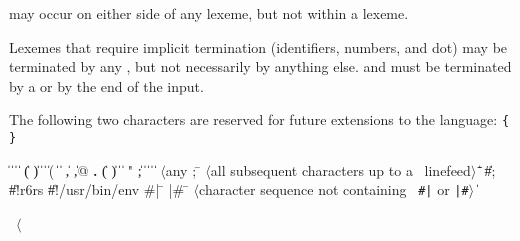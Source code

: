  may occur on either side of any lexeme, but not
within a lexeme.

\vest Lexemes that require implicit termination (identifiers, numbers,
and dot) may be terminated by any , but not
necessarily by anything else.   and 
must be terminated by a  or by the end of the input.

The following two characters are reserved for future extensions to the
language: {\tt \verb"{" \verb"}"}

\begin{grammar}%
 \:  \|  \| 
\>  \|  \| 
\>  \| ( \| ) \| \openbracket{} \| \closedbracket{} \| \sharpsign( \| \singlequote{} \| \backquote{} \| , \| ,@ \| {\bf.}
 \:  \| ( \| ) \| \openbracket{} \| \closedbracket{} " \| ;
 \:  \| 
\> \|  \|  
\> \| 
 \: $\langle${\rm any }
\> 
 \: ; \= $\langle$\rm all subsequent characters up to a
                    \>\ \rm linefeed$\rangle$
\qquad \= \| 
\> \| \#; 
\> \| \#!r6rs \| \#!/usr/bin/env
 \: \#| \= 
\>  |\#
 \: \= $\langle$\rm character sequence not containing
\>\ \rm {\tt \#|} or {\tt |\#}$\rangle$
 \:  
 \:  \| 
 \: %
\end{grammar}

\label{extendedalphas}
\label{identifiersyntax}

\hbox{\cf{} \goesto{} $\langle$}

